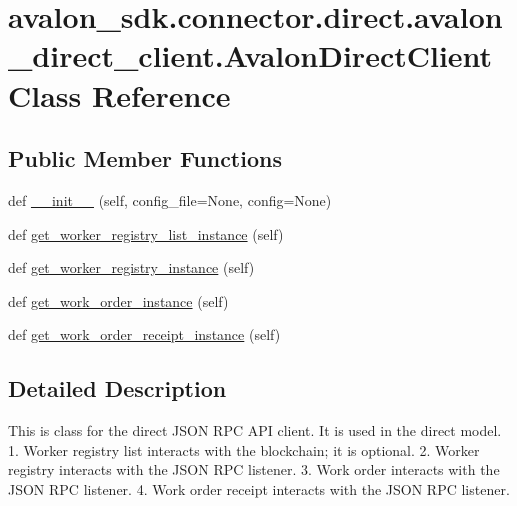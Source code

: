 \hypertarget{classavalon__sdk_1_1connector_1_1direct_1_1avalon__direct__client_1_1AvalonDirectClient}{}\section{avalon\+\_\+sdk.\+connector.\+direct.\+avalon\+\_\+direct\+\_\+client.\+Avalon\+Direct\+Client Class Reference}
\label{classavalon__sdk_1_1connector_1_1direct_1_1avalon__direct__client_1_1AvalonDirectClient}
\subsection*{Public Member Functions}
\begin{DoxyCompactItemize}
\item 
def \hyperlink{classavalon__sdk_1_1connector_1_1direct_1_1avalon__direct__client_1_1AvalonDirectClient_ad64378b0434e723bf4c30edd28d602f6}{\+\_\+\+\_\+init\+\_\+\+\_\+} (self, config\+\_\+file=None, config=None)
\item 
def \hyperlink{classavalon__sdk_1_1connector_1_1direct_1_1avalon__direct__client_1_1AvalonDirectClient_aa783017b8526a49693f02a2d854acb86}{get\+\_\+worker\+\_\+registry\+\_\+list\+\_\+instance} (self)
\item 
def \hyperlink{classavalon__sdk_1_1connector_1_1direct_1_1avalon__direct__client_1_1AvalonDirectClient_a4b5c73957a38d43d6cc45a48543c4dd2}{get\+\_\+worker\+\_\+registry\+\_\+instance} (self)
\item 
def \hyperlink{classavalon__sdk_1_1connector_1_1direct_1_1avalon__direct__client_1_1AvalonDirectClient_ae0870a0d36c9bf9f9c40df6041b56b2e}{get\+\_\+work\+\_\+order\+\_\+instance} (self)
\item 
def \hyperlink{classavalon__sdk_1_1connector_1_1direct_1_1avalon__direct__client_1_1AvalonDirectClient_af8be5119b4f254c690f0d5a8ceb75f41}{get\+\_\+work\+\_\+order\+\_\+receipt\+\_\+instance} (self)
\end{DoxyCompactItemize}


\subsection{Detailed Description}
\begin{DoxyVerb}This is class for the direct JSON RPC API client.
It is used in the direct model.
1. Worker registry list interacts with the blockchain; it is optional.
2. Worker registry interacts with the JSON RPC listener.
3. Work order interacts with the JSON RPC listener.
4. Work order receipt interacts with the JSON RPC listener.
\end{DoxyVerb}
 


